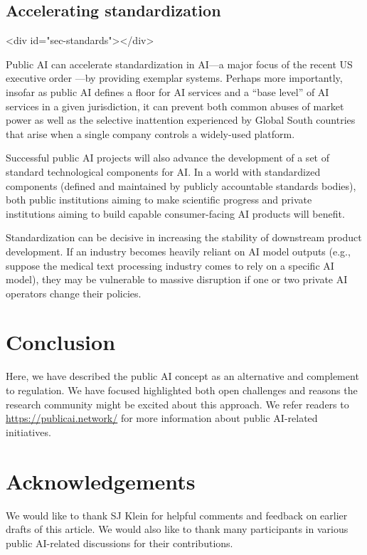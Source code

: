 \documentclass{article}
\begin{document}
\subsection{Accelerating standardization}<div id="sec-standards"></div>


Public AI can accelerate standardization in AI---a major focus of the recent US executive order \cite{thewhitehouseFACTSHEETPresident2023}---by providing exemplar systems. Perhaps more importantly, insofar as public AI defines a floor for AI services and a ``base level'' of AI services in a given jurisdiction, it can prevent both common abuses of market power as well as the selective inattention experienced by Global South countries that arise when a single company controls a widely-used platform.

Successful public AI projects will also advance the development of a set of standard technological components for AI. In a world with standardized components (defined and maintained by publicly accountable standards bodies), both public institutions aiming to make scientific progress and private institutions aiming to build capable consumer-facing AI products will benefit.

Standardization can be decisive in increasing the stability of downstream product development. If an industry becomes heavily reliant on AI model outputs (e.g., suppose the medical text processing industry comes to rely on a specific AI model), they may be vulnerable to massive disruption if one or two private AI operators change their policies.



\section{Conclusion}
Here, we have described the public AI concept as an alternative and complement to regulation. We have focused highlighted both open challenges and reasons the research community might be excited about this approach. We refer readers to \url{https://publicai.network/} for more information about public AI-related initiatives.

\section{Acknowledgements}
We would like to thank SJ Klein for helpful comments and feedback on earlier drafts of this article. We would also like to thank many participants in various public AI-related discussions for their contributions.



\end{document}
